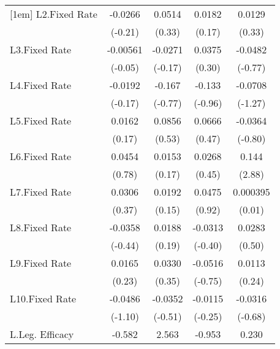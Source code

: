 {\begin{longtable}{l*{4}{c}}
[1em]
L2.Fixed Rate   &  -0.0266         &   0.0514         &   0.0182         &   0.0129         \\
                &  (-0.21)         &   (0.33)         &   (0.17)         &   (0.33)         \\
[1em]
L3.Fixed Rate   & -0.00561         &  -0.0271         &   0.0375         &  -0.0482         \\
                &  (-0.05)         &  (-0.17)         &   (0.30)         &  (-0.77)         \\
[1em]
L4.Fixed Rate   &  -0.0192         &   -0.167         &   -0.133         &  -0.0708         \\
                &  (-0.17)         &  (-0.77)         &  (-0.96)         &  (-1.27)         \\
[1em]
L5.Fixed Rate   &   0.0162         &   0.0856         &   0.0666         &  -0.0364         \\
                &   (0.17)         &   (0.53)         &   (0.47)         &  (-0.80)         \\
[1em]
L6.Fixed Rate   &   0.0454         &   0.0153         &   0.0268         &    0.144\sym{**} \\
                &   (0.78)         &   (0.17)         &   (0.45)         &   (2.88)         \\
[1em]
L7.Fixed Rate   &   0.0306         &   0.0192         &   0.0475         & 0.000395         \\
                &   (0.37)         &   (0.15)         &   (0.92)         &   (0.01)         \\
[1em]
L8.Fixed Rate   &  -0.0358         &   0.0188         &  -0.0313         &   0.0283         \\
                &  (-0.44)         &   (0.19)         &  (-0.40)         &   (0.50)         \\
[1em]
L9.Fixed Rate   &   0.0165         &   0.0330         &  -0.0516         &   0.0113         \\
                &   (0.23)         &   (0.35)         &  (-0.75)         &   (0.24)         \\
[1em]
L10.Fixed Rate  &  -0.0486         &  -0.0352         &  -0.0115         &  -0.0316         \\
                &  (-1.10)         &  (-0.51)         &  (-0.25)         &  (-0.68)         \\
[1em]
L.Leg. Efficacy &   -0.582         &    2.563         &   -0.953         &    0.230         \\

\end{longtable}}
